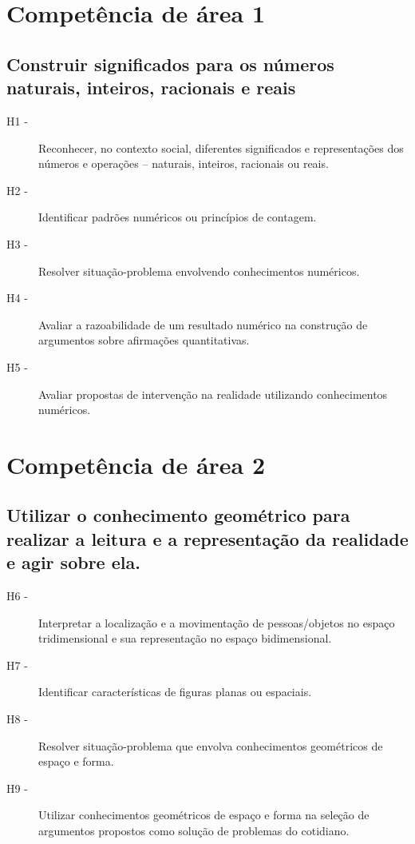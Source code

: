 \section*{Competência de área 1}
    \subsection*{Construir significados para os números naturais, inteiros, racionais e reais}
    	\begin{description}
    		\item[H1 -]Reconhecer, no contexto social, diferentes significados e representações dos números e operações – naturais, inteiros,
    		racionais ou reais.
    		\item[H2 -]Identificar padrões numéricos ou princípios de contagem.
    		\item[H3 -]Resolver situação-problema envolvendo conhecimentos numéricos.
    		\item[H4 -]Avaliar a razoabilidade de um resultado numérico na construção de argumentos sobre afirmações quantitativas.
    		\item[H5 -]Avaliar propostas de intervenção na realidade utilizando conhecimentos numéricos.
    	\end{description}
	
\section*{Competência de área 2}
    \subsection*{Utilizar o conhecimento geométrico para realizar a leitura e a
    	representação da realidade e agir sobre ela.}
    	\begin{description}
    		\item [H6 -]Interpretar a localização e a movimentação de pessoas/objetos no espaço tridimensional e sua representação no espaço bidimensional.
    		\item [H7 -]Identificar características de figuras planas ou espaciais.
    		\item [H8 -]Resolver situação-problema que envolva conhecimentos geométricos de espaço e forma.
    		\item [H9 -]Utilizar conhecimentos geométricos de espaço e forma na seleção de argumentos propostos como solução de problemas do cotidiano.
    	\end{description}

